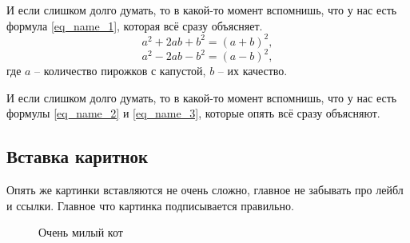 \documentclass[a4paper, 12pt]{article}
\begin{document}
И если слишком долго думать, то в какой-то момент вспомнишь, что у нас есть формула \ref{eq_name_1}, которая всё сразу объясняет.
\begin{equation}
    a^2 + 2ab + b ^2 = (a + b)^2,
    \label{eq_name_2}
\end{equation}
\begin{equation}
    a^2 - 2ab - b^2 = (a - b)^2,
    \label{eq_name_3}
\end{equation}
где $a$ -- количество пирожков с капустой, $b$ -- их качество.

И если слишком долго думать, то в какой-то момент вспомнишь, что у нас есть формулы \ref{eq_name_2} и \ref{eq_name_3}, которые опять всё сразу объясняют.

\subsection{Вставка каритнок}
Опять же картинки вставляются не очень сложно, главное не забывать про лейбл и ссылки. Главное что картинка подписывается правильно.
\begin{figure}[h]
    \caption{\label{img_cat}Очень милый кот}
\end{figure}
\end{document}

